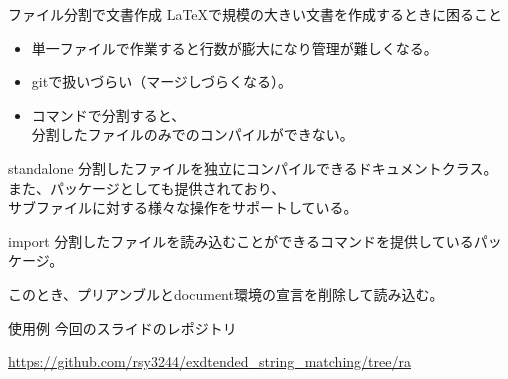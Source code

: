 \documentclass[dvipdfmx,12pt,beamer]{standalone}
\begin{document}
\begin{frame}[fragile]{ファイル分割で文書作成}
	\LaTeX で規模の大きい文書を作成するときに困ること
	\begin{itemize}
		\item 単一ファイルで作業すると行数が膨大になり管理が難しくなる。
		\item gitで扱いづらい（マージしづらくなる）。
		\item \verb++コマンドで分割すると、\\分割したファイルのみでのコンパイルができない。
	\end{itemize}

	\begin{block}{standalone}
		分割したファイルを独立にコンパイルできるドキュメントクラス。
		また、パッケージとしても提供されており、\\サブファイルに対する様々な操作をサポートしている。
	\end{block}
	\begin{block}{import}
		分割したファイルを読み込むことができる\verb++コマンドを提供しているパッケージ。

		このとき、プリアンブルとdocument環境の宣言を削除して読み込む。
	\end{block}
\end{frame}

\begin{frame}{使用例}
	今回のスライドのレポジトリ

	\url{https://github.com/rsy3244/exdtended_string_matching/tree/ra}
\end{frame}
\end{document}
